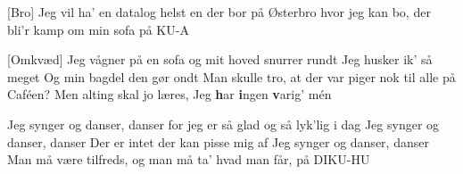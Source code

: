 \documentclass[a4paper,11pt]{article}
\begin{document}
\begin{song}
[Bro] Jeg vil ha' en datalog
helst en der bor på Østerbro
hvor jeg kan bo, der bli'r kamp om min sofa på KU-A


[Omkvæd] Jeg vågner på en sofa
og mit hoved snurrer rundt
Jeg husker ik' så meget
Og min bagdel den gør ondt
Man skulle tro, at der var piger nok til alle på Caféen?
Men alting skal jo læres,
Jeg \textbf{h}ar \textbf{i}ngen \textbf{v}arig' mén

Jeg synger og danser, danser
for jeg er så glad og så lyk'lig i dag
Jeg synger og danser, danser
Der er intet der kan pisse mig af
Jeg synger og danser, danser
Man må være tilfreds, og man må ta' hvad man får, på DIKU-HU


\end{song}
\end{document}

